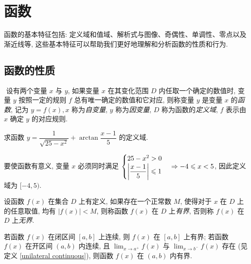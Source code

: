 \section{函数}

函数的基本特征包括: 定义域和值域、解析式与图像、奇偶性、单调性、零点以及渐近线等, 这些基本特征可以帮助我们更好地理解和分析函数的性质和行为.

\subsection{函数的性质}

\begin{definition}[函数的概念]
    $  $ 设有两个变量 $ x $ 与 $ y $, 如果变量 $ x $ 在其变化范围 $ D $ 内任取一个确定的数值时, 变量 $ y $ 按照一定的规则 $ f $ 总有唯一确定的数值和它对应, 则称变量 $ y $ 是变量 $ x $ 的\textit{函数}, 记为 $ y=f(x), x $ 称为\textit{自变量}, $ y $ 称为\textit{因变量}, $ D $ 称为函数的\textit{定义域}, $ f $ 表示由 $ x $ 确定 $ y $ 的对应规则.
\end{definition}

\begin{example}
    求函数 $y=\dfrac{1}{\sqrt{25-x^2}}+\arctan\dfrac{x-1}{5}$ 的定义域.
\end{example}
\begin{solution}
    要使函数有意义, 变量 $x$ 必须同时满足 $\begin{cases}
            25-x^2>0 \\\qty|\dfrac{x-1}{5}|\leqslant 1
        \end{cases}\Rightarrow -4\leqslant x<5$, 因此定义域为 $[-4,5).$
\end{solution}

\begin{definition}[有界性]
    设函数 $ f(x) $ 在集合 $ D $ 上有定义, 如果存在一个正常数 $ M $, 使得对于 $ x$ 在 $ D $ 上的任意取值, 均有 $ |f(x)|<M $, 则称函数 $ f(x) $ 在 $ D $ 上\textit{有界}, 否则称 $ f(x) $ 在 $ D $ 上\textit{无界}.
\end{definition}

\begin{theorem}[函数的有界性定理]
    若函数 $f(x)$ 在闭区间 $[a,b]$ 上连续, 则 $f(x)$ 在 $[a,b]$ 上有界;
    若函数 $f(x)$ 在开区间 $(a,b)$ 内连续, 且 $\displaystyle\lim_{x\to a^+}f(x)$ 与 $\displaystyle\lim_{x\to b^-}f(x)$ 存在 (见定义 \ref{unilateral continuous}), 则函数 $f(x)$ 在 $(a,b)$ 内有界.
\end{theorem}

